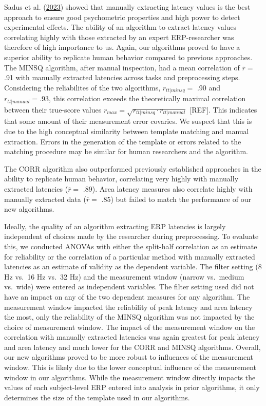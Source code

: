 \documentclass[
  man]{apa7}
\begin{document}
Sadus et al. (\protect\hyperlink{ref-sadus2023multiverse}{2023}) showed that manually extracting latency values is the best approach to ensure good psychometric properties and high power to detect experimental effects. The ability of an algorithm to extract latency values correlating highly with those extracted by an expert ERP-researcher was therefore of high importance to us.
Again, our algorithms proved to have a superior ability to replicate human behavior compared to previous approaches. The MINSQ algorithm, after manual inspection, had a mean correlation of \(\overline{r} =\) .91 with manually extracted latencies across tasks and preprocessing steps. Considering the reliabilites of the two algorithms, \(r_{tt|minsq} =\) .90 and \(r_{tt|manual} = .93\), this correlation exceeds the theoretically maximal correlation between their true-score values \(r_{max} = \sqrt{r_{tt|minsq} \cdot r_{tt|manual}}\) {[}REF{]}. This indicates that some amount of their measurement error covaries. We suspect that this is due to the high conceptual similarity between template matching and manual extraction. Errors in the generation of the template or errors related to the matching procedure may be similar for human researchers and the algorithm.

The CORR algorithm also outperformed previously established approaches in the ability to replicate human behavior, correlating very highly with manually extracted latencies (\(\overline{r} =\) .89). Area latency measures also correlate highly with manually extracted data (\(\overline{r} =\) .85) but failed to match the performance of our new algorithms.

Ideally, the quality of an algorithm extracting ERP latencies is largely independent of choices made by the researcher during preprocessing. To evaluate this, we conducted ANOVAs with either the split-half correlation as an estimate for reliability or the correlation of a particular method with manually extracted latencies as an estimate of validity as the dependent variable. The filter setting (8 Hz vs.~16 Hz vs.~32 Hz) and the measurement window (narrow vs.~medium vs.~wide) were entered as independent variables. The filter setting used did not have an impact on any of the two dependent measures for any algorithm. The measurement window impacted the reliability of peak latency and area latency the most, only the reliability of the MINSQ algorithm was not impacted by the choice of measurement window. The impact of the measurement window on the correlation with manually extracted latencies was again greatest for peak latency and area latency and much lower for the CORR and MINSQ algorithms. Overall, our new algorithms proved to be more robust to influences of the measurement window. This is likely due to the lower conceptual influence of the measurement window in our algorithms. While the measurement window directly impacts the values of each subject-level ERP entered into analysis in prior algorithms, it only determines the size of the template used in our algorithms.
\end{document}
